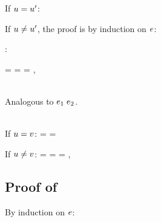 If $u=u'$:
\StepO{\esbsren{\esbsren{\expr}}=\expr=\esbsren{\expr}}
      {}

\noindent
If $u\neq u'$, the proof is by induction on $e$:

\begin{bycase}

\Case{$\varI$}

\Case{$\var\neq\varI$}

\Case{$\opO$, $\descopO$, $\pjop{\fnam}$}:
\StepO{\esbsren{\esbsren{\expr}}=\expr=\esbsren{\expr}}
      {}

\Case{$\appO$}
\StepOL
{\esbsren{\esbsren{(\appO)}}
 =
 =
 =
 \esbsren{(\appO)}}
{, \indhyp}

\Case{$\eqO$, $\iifO$}\\
Analogous to $\appO$.

\Case{$\absO$}\\
If $u=v$:
\StepO
{\esbsren{\esbsren{(\absO)}}
 =
 \absO
 =
 \esbsren{(\absO)}}
{}

If $u\neq v$:
\StepOL
{\esbsren{\esbsren{(\absO)}}
 =
 \abs{\var}{\typ}{\esbsren{\esbsren{\expr}}}
 =
 \abs{\var}{\typ}{\esbsren{\expr}}
 =
 \esbsren{(\absO)}}
{, \indhyp}

\end{bycase}


\subsection*{Proof of }

By induction on $e$:

